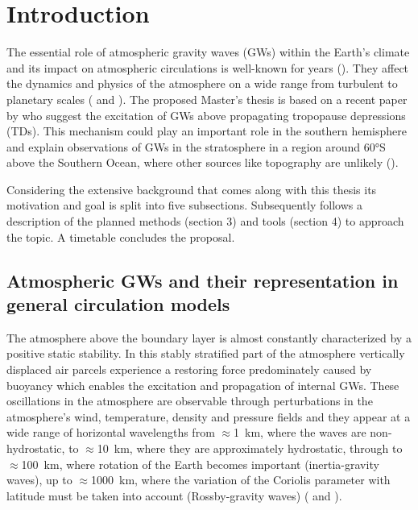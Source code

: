 \section{Introduction}
\label{sec:intro} 

The essential role of atmospheric gravity waves (GWs) within the Earth's climate and its impact on atmospheric circulations is well-known for years (\cite{fritts_gravity_2003}). They affect the dynamics and physics of the atmosphere on a wide range from turbulent to planetary scales (\cite{plougonven_how_2020} and \cite{williams_census_2017}). The proposed Master's thesis is based on a recent paper by \textcite{dornbrack_stratospheric_2021} who suggest the excitation of GWs above propagating tropopause depressions (TDs). This mechanism could play an important role in the southern hemisphere and explain observations of GWs in the stratosphere in a region around 60°S above the Southern Ocean, where other sources like topography are unlikely (\cite{hindley_18year_2020}).

Considering the extensive background that comes along with this thesis its motivation and goal is split into five subsections. Subsequently follows a description of the planned methods (section 3) and tools (section 4) to approach the topic. A timetable concludes the proposal. 

%
%
\subsection{Atmospheric GWs and their representation in general circulation models}
\label{subsec:GWs}
%
The atmosphere above the boundary layer is almost constantly characterized by a positive static stability. In this stably stratified part of the atmosphere vertically displaced air parcels experience a restoring force predominately caused by buoyancy which enables the excitation and propagation of internal GWs. These oscillations in the atmosphere are observable through perturbations in the atmosphere's wind, temperature, density and pressure fields and they appear at a wide range of horizontal wavelengths from $\approx$\SI{1}{\kilo\meter}, where the waves are non-hydrostatic, to $\approx$\SI{10}{\kilo\meter}, where they are approximately hydrostatic, through to $\approx$\SI{100}{\kilo\meter}, where rotation of the Earth becomes important (inertia-gravity waves), up to $\approx$\SI{1000}{\kilo\meter}, where the variation of the Coriolis parameter with latitude must be taken into account (Rossby-gravity waves)
(\cite{teixeira_physics_2014} and \cite{gill_atmosphere-ocean_1982}).

